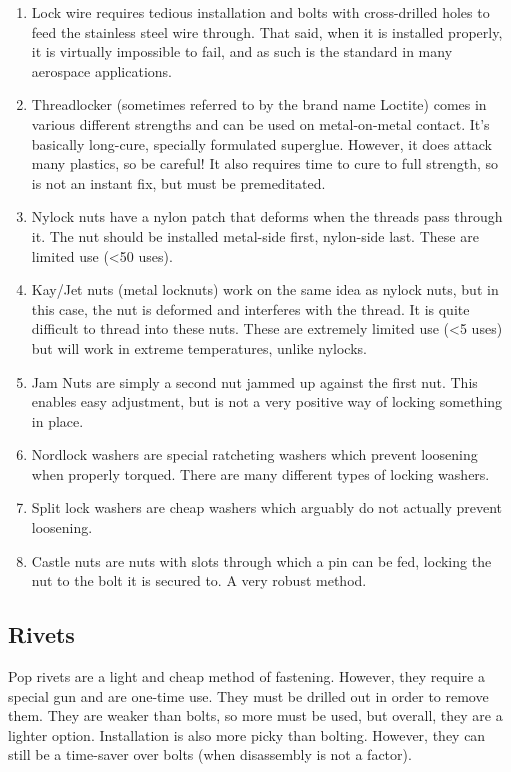 \documentclass[10pt,letterpaper]{book}
\begin{document}
	\begin{enumerate}[label=\alph*]
		\item Lock wire requires tedious installation and bolts with cross-drilled holes to feed the stainless steel wire through. That said, when it is installed properly, it is virtually impossible to fail, and as such is the standard in many aerospace applications. 
		\item Threadlocker (sometimes referred to by the brand name Loctite) comes in various different strengths and can be used on metal-on-metal contact. It's basically long-cure, specially formulated superglue. However, it does attack many plastics, so be careful! It also requires time to cure to full strength, so is not an instant fix, but must be premeditated.
		\item Nylock nuts have a nylon patch that deforms when the threads pass through it. The nut should be installed metal-side first, nylon-side last. These are limited use (<50 uses).
		\item Kay/Jet nuts (metal locknuts) work on the same idea as nylock nuts, but in this case, the nut is deformed and interferes with the thread. It is quite difficult to thread into these nuts. These are extremely limited use (<5 uses) but will work in extreme temperatures, unlike nylocks.
		\item Jam Nuts are simply a second nut jammed up against the first nut. This enables easy adjustment, but is not a very positive way of locking something in place.
		\item Nordlock washers are special ratcheting washers which prevent loosening when properly torqued. There are many different types of locking washers.
		\item Split lock washers are cheap washers which arguably do not actually prevent loosening.
		\item Castle nuts are nuts with slots through which a pin can be fed, locking the nut to the bolt it is secured to. A very robust method.
	\end{enumerate}
	
	\subsection{Rivets}
	
	Pop rivets are a light and cheap method of fastening. However, they require a special gun and are one-time use. They must be drilled out in order to remove them. They are weaker than bolts, so more must be used, but overall, they are a lighter option. Installation is also more picky than bolting. However, they can still be a time-saver over bolts (when disassembly is not a factor).
	
\end{document}
